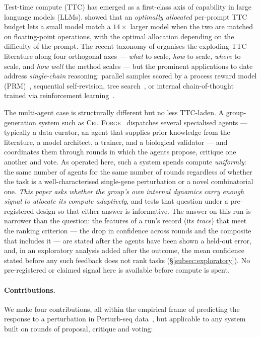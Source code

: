\documentclass[10pt,a4paper]{article}
\begin{document}
Test-time compute (TTC) has emerged as a first-class axis of capability in
large language models (LLMs). \citet{snell2024scaling} showed that an
\emph{optimally allocated} per-prompt TTC budget lets a small model match a
$14\times$ larger model when the two are matched on floating-point operations, with the optimal
allocation depending on the difficulty of the prompt. The recent taxonomy of
\citet{zhang2025ttssurvey} organises the exploding TTC literature along four
orthogonal axes --- \emph{what} to scale, \emph{how} to scale, \emph{where} to
scale, and \emph{how well} the method scales --- but the prominent
applications to date address \emph{single-chain} reasoning: parallel samples
scored by a process reward model (PRM)~\citep{lightman2024prm}, sequential
self-revision, tree search~\citep{yao2023tot}, or internal chain-of-thought
trained via reinforcement learning~\citep{deepseek2025r1,muennighoff2025s1}.

The multi-agent case is structurally different but no less TTC-laden. A
group-generation system such as \textsc{CellForge}~\citep{chen2025cellforge}
dispatches several specialised agents --- typically a data curator, an
agent that supplies prior knowledge from the literature, a model architect, a
trainer, and a biological validator --- and coordinates them through rounds in
which the agents propose, critique one another and vote. As
operated here, such a system spends compute \emph{uniformly}: the same number of agents
for the same number of rounds regardless of whether the task is a
well-characterised single-gene perturbation or a novel combinatorial one.
\emph{This paper asks whether the group's own internal dynamics carry enough
signal to allocate its compute adaptively}, and tests that question under a
pre-registered design so that either answer is informative. The answer on this
run is narrower than the question: the features of a run's record (its
\emph{trace}) that meet the ranking criterion --- the drop in confidence across
rounds and the composite that includes it --- are
stated after the agents have been shown a held-out error, and, in an exploratory
analysis added after the outcome, the mean confidence stated before any such
feedback does not rank tasks (\S\ref{subsec:exploratory}). No pre-registered or
claimed signal here is available before compute is spent.

\paragraph{Contributions.} We make four contributions, all within the
empirical frame of predicting the response to a perturbation in Perturb-seq
data~\citep{norman2019perturbseq,%
adamson2016perturbseq}, but applicable to any system built on rounds of proposal,
critique and voting:
\end{document}
